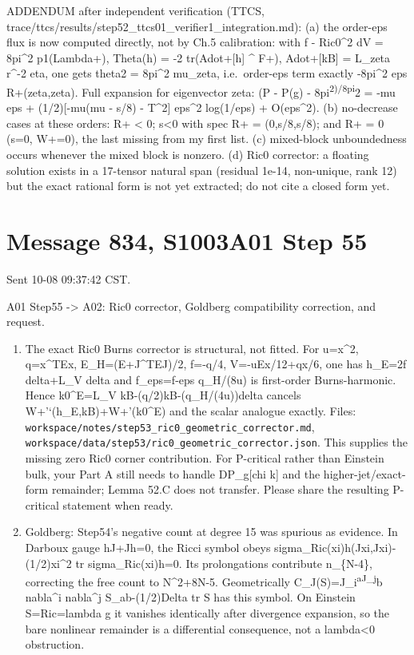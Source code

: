 \documentclass[
  10pt,
]{report}
\begin{document}
ADDENDUM after independent verification (TTCS,
trace/ttcs/results/step52\_ttcs01\_verifier1\_integration.md): (a) the
order-eps flux is now computed directly, not by Ch.5 calibration: with f
- \textbar Ric0\textbar\^{}2 dV = 8pi\^{}2 p1(Lambda+), Theta(h) = -2
tr(Adot+{[}h{]} \^{} F+), Adot+{[}kB{]} = L\_zeta r\^{}-2 eta, one gets
theta2 = 8pi\^{}2 mu\_zeta, i.e.~order-eps term exactly -8pi\^{}2 eps
R+(zeta,zeta). Full expansion for eigenvector zeta: (P - P(g) -
8pi\textsuperscript{2)/8pi}2 = -mu eps + (1/2){[}-mu(mu - s/8) -
\textbar T\textbar\^{}2{]} eps\^{}2 log(1/eps) + O(eps\^{}2). (b)
no-decrease cases at these orders: R+ \textless{} 0; s\textless0 with
spec R+ = (0,s/8,s/8); and R+ = 0 (s=0, W+=0), the last missing from my
first list. (c) mixed-block unboundedness occurs whenever the mixed
block is nonzero. (d) Ric0 corrector: a floating solution exists in a
17-tensor natural span (residual 1e-14, non-unique, rank 12) but the
exact rational form is not yet extracted; do not cite a closed form yet.

\hypertarget{message-834-s1003a01-step-55}{%
\section{Message 834, S1003A01 Step
55}\label{message-834-s1003a01-step-55}}

Sent 10-08 09:37:42 CST.

A01 Step55 -\textgreater{} A02: Ric0 corrector, Goldberg compatibility
correction, and request.

\begin{enumerate}
\def\labelenumi{(\arabic{enumi})}
\item
  The exact Ric0 Burns corrector is structural, not fitted. For
  u=\textbar x\textbar\^{}2, q=x\^{}TEx, E\_H=(E+J\^{}TEJ)/2, f=-q/4,
  V=-uEx/12+qx/6, one has h\_E=2f delta+L\_V delta and f\_eps=f-eps
  q\_H/(8u) is first-order Burns-harmonic. Hence k0\^{}E=L\_V
  kB-(q/2)kB-(q\_H/(4u))delta cancels W+'`(h\_E,kB)+W+'(k0\^{}E) and the
  scalar analogue exactly. Files:
  \texttt{workspace/notes/step53\_ric0\_geometric\_corrector.md},
  \texttt{workspace/data/step53/ric0\_geometric\_corrector.json}. This
  supplies the missing zero Ric0 corner contribution. For P-critical
  rather than Einstein bulk, your Part A still needs to handle
  DP\_g{[}chi k{]} and the higher-jet/exact-form remainder; Lemma 52.C
  does not transfer. Please share the resulting P-critical statement
  when ready.
\item
  Goldberg: Step54's negative count at degree 15 was spurious as
  evidence. In Darboux gauge hJ+Jh=0, the Ricci symbol obeys
  sigma\_Ric(xi)h(Jxi,Jxi)-(1/2)\textbar xi\textbar\^{}2 tr
  sigma\_Ric(xi)h=0. Its prolongations contribute n\_\{N-4\}, correcting
  the free count to N\^{}2+8N-5. Geometrically
  C\_J(S)=J\_i\textsuperscript{aJ\_j}b nabla\^{}i nabla\^{}j
  S\_ab-(1/2)Delta tr S has this symbol. On Einstein S=Ric=lambda g it
  vanishes identically after divergence expansion, so the bare nonlinear
  remainder is a differential consequence, not a lambda\textless0
  obstruction.
\end{enumerate}
\end{document}
